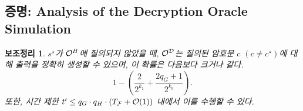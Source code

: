 \documentclass{article}
\newtheorem{lemma}{보조정리}
\theoremstyle{definition}
\begin{document}
\subsection{증명: Analysis of the Decryption Oracle Simulation}


\begin{tcolorbox}[colback=white]
	\begin{lemma}
		$s^\star$가 $\mathcal{O}^{H}$에 질의되지 않았을 때, $\mathcal{O}^{\mathcal{D}}$는 질의된
		암호문 $c$ $(c \neq c^\star)$에 대해 출력을 정확히 생성할 수 있으며, 이
		확률은 다음보다 크거나 같다.
		$$
			1 - \left( \frac{2}{2^{k_1}} + \frac{2q_G + 1}{2^{k_0}} \right).
		$$
		또한, 시간 제한 $t' \leq q_G \cdot q_H \cdot (T_{\mathcal{F}} + \mathcal{O}(1))$ 내에서 이를 수행할 수 있다.
	\end{lemma}
\end{tcolorbox}
\end{document}
